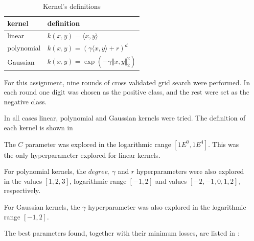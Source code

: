 \documentclass[a4paper,11pt]{article}
\begin{document}
\begin{table}
    \centering
    \begin{tabular*}{0.544\textwidth}{|l|l|}
        \hline
        kernel     & definition \\
        \hline
        linear     & $k(x, y) = \langle x, y \rangle$ \\
        polynomial & $k(x, y) = (\gamma\langle x, y \rangle + r)^d$ \\
        Gaussian   & $k(x, y) = \exp(-\gamma \Vert x, y\Vert^2_2)$ \\
        \hline
    \end{tabular*}
    \caption{Kernel's definitions}
    \label{tab:table2}
\end{table}

For this assignment, nine rounds of cross validated grid search were performed. In each round one digit was chosen as the positive class, and the rest were set as the negative class.

In all cases linear, polynomial and Gaussian kernels were tried. The definition of each kernel is shown in 

The $C$ parameter was explored in the logarithmic range $[1E^0, 1E^4]$. This was the only hyperparameter explored for linear kernels.

For polynomial kernels, the $degree$, $\gamma$ and $r$ hyperparameters were also explored in the values $[1, 2, 3]$, logarithmic range $[-1, 2]$ and values $[-2, -1, 0, 1, 2]$, respectively.

For Gaussian kernels, the $\gamma$ hyperparameter was also explored in the logarithmic range $[-1, 2]$.


The best parameters found, together with their minimum losses, are listed in :
\end{document}
